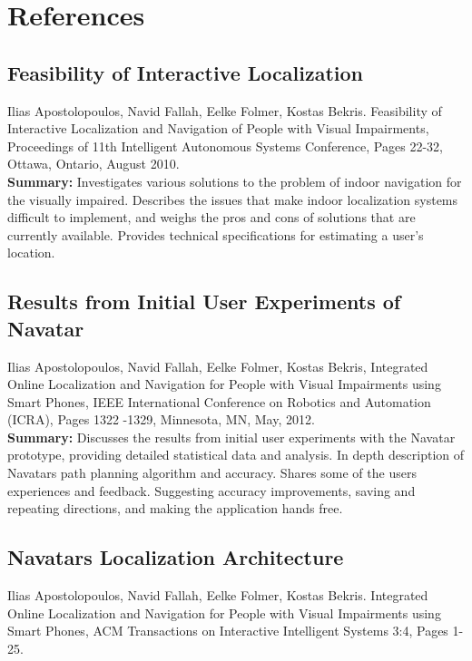 \documentclass{scrreprt}
\begin{document}
\chapter{References}

\section{Feasibility of Interactive Localization}
Ilias Apostolopoulos, Navid Fallah, Eelke Folmer, Kostas Bekris. Feasibility of Interactive Localization and Navigation of People with Visual Impairments, Proceedings of 11th Intelligent Autonomous Systems Conference, Pages 22-32, Ottawa, Ontario, August 2010.\\
 
 \textbf{Summary:}
 Investigates various solutions to the problem of indoor navigation for the visually impaired. Describes the issues that make indoor localization systems difficult to implement, and weighs the pros and cons of solutions that are currently available. Provides technical specifications for estimating a user’s location.
 
\section{Results from Initial User Experiments of Navatar}
Ilias Apostolopoulos, Navid Fallah, Eelke Folmer, Kostas Bekris, Integrated Online Localization and Navigation for People with Visual Impairments using Smart Phones, IEEE International Conference on Robotics and Automation (ICRA), Pages 1322 -1329, Minnesota, MN, May, 2012.\\

\textbf{Summary:}
Discusses the results from initial user experiments with the Navatar prototype, providing detailed statistical data and analysis. In depth description of Navatar\textsc{}s path planning algorithm and accuracy. Shares some of the user\textsc{}s experiences and feedback. Suggesting accuracy improvements, saving and repeating directions, and making the application hands free.

\section{Navatar\textsc{}s Localization Architecture}
 Ilias Apostolopoulos, Navid Fallah, Eelke Folmer, Kostas Bekris. Integrated Online Localization and Navigation for People with Visual Impairments using Smart Phones, ACM Transactions on Interactive Intelligent Systems 3:4, Pages 1-25.\\
\end{document}
